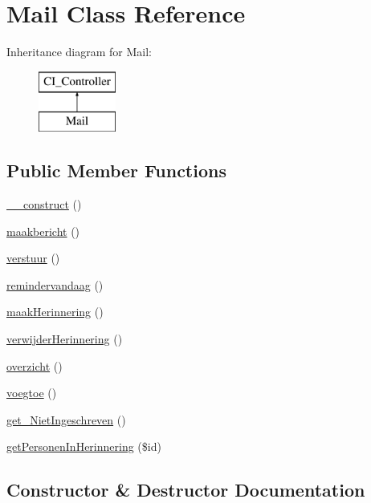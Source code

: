 \hypertarget{class_mail}{}\section{Mail Class Reference}
\label{class_mail}
Inheritance diagram for Mail\+:\begin{figure}[H]
\begin{center}
\leavevmode
\includegraphics[height=2.000000cm]{class_mail}
\end{center}
\end{figure}
\subsection*{Public Member Functions}
\begin{DoxyCompactItemize}
\item 
\mbox{\hyperlink{class_mail_a095c5d389db211932136b53f25f39685}{\+\_\+\+\_\+construct}} ()
\item 
\mbox{\hyperlink{class_mail_a81e2a70ab567831ba097167138f7a01f}{maakbericht}} ()
\item 
\mbox{\hyperlink{class_mail_abc7aefe96831182f37ef67ef34e62527}{verstuur}} ()
\item 
\mbox{\hyperlink{class_mail_ad32500041b0b1aca5cb9857134aef2fa}{remindervandaag}} ()
\item 
\mbox{\hyperlink{class_mail_a6c70daaf35d6c8f7ff2531c57b5e8cbb}{maak\+Herinnering}} ()
\item 
\mbox{\hyperlink{class_mail_af953414894f70a47dcf5986212c7e68d}{verwijder\+Herinnering}} ()
\item 
\mbox{\hyperlink{class_mail_aedd51c36c569faeb3c151027eb79e67d}{overzicht}} ()
\item 
\mbox{\hyperlink{class_mail_aba42b30d30a5aca661ea48add5edb520}{voegtoe}} ()
\item 
\mbox{\hyperlink{class_mail_a7b5977af30820df385dc88ee0fd2a6bd}{get\+\_\+\+Niet\+Ingeschreven}} ()
\item 
\mbox{\hyperlink{class_mail_a08ee322d4585335986150c5b3504b1a6}{get\+Personen\+In\+Herinnering}} (\$id)
\end{DoxyCompactItemize}


\subsection{Constructor \& Destructor Documentation}
\mbox{\label{class_mail_a095c5d389db211932136b53f25f39685}} 
